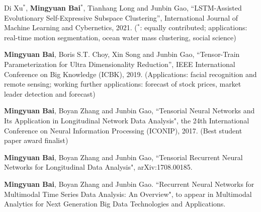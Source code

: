 \documentclass[margin, 11pt]{res} %
\begin{document}
\begin{resume}
Di Xu$^*$, \textbf{Mingyuan Bai}$^*$, Tianhang Long and Junbin Gao, ``LSTM-Assisted Evolutionary Self-Expressive Subspace Clustering'', International Journal of Machine Learning and Cybernetics, 2021. ($^*$: equally contributed; applications: real-time motion segmentation, ocean water mass clustering, social science)

\textbf{Mingyuan Bai}, Boris S.T. Choy, Xin Song and Junbin Gao, ``Tensor-Train Parameterization for Ultra Dimensionality Reduction'', IEEE International Conference on Big Knowledge (ICBK), 2019. (Applications: facial recognition and remote sensing; working further applications: forecast of stock prices, market leader detection and forecast)

\textbf{Mingyuan Bai}, Boyan Zhang and Junbin Gao, ``Tensorial Neural Networks and Its Application in Longitudinal Network Data Analysis", the 24th International Conference on Neural Information Processing (ICONIP), 2017. (Best student paper award finalist)

\textbf{Mingyuan Bai}, Boyan Zhang and Junbin Gao, ``Tensorial Recurrent Neural Networks for Longitudinal Data Analysis", arXiv:1708.00185.

\textbf{Mingyuan Bai}, Boyan Zhang and Junbin Gao. ``Recurrent Neural Networks for Multimodal Time Series Data Analysis: An Overview", to appear in Multimodal Analytics for Next Generation Big Data Technologies and Applications.
\end{resume}
\end{document}
